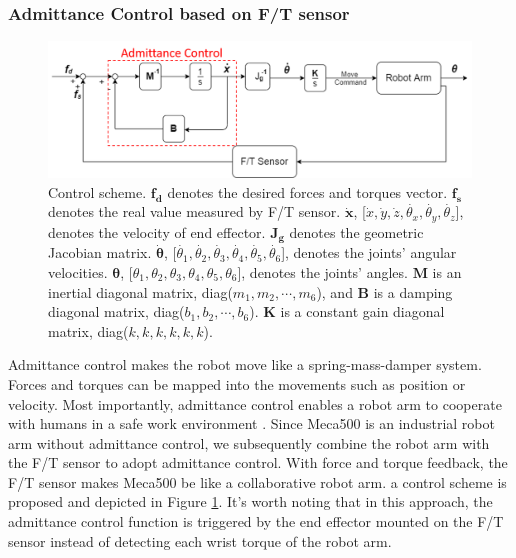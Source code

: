 \subsubsection{Admittance Control based on F/T sensor}
\label{sec:adm ctrl}
\begin{figure}[htbp]
\begin{center}
\includegraphics[width=0.9\linewidth]{Images/adm ctrl.png}
\caption{
Control scheme. $\boldsymbol{f_d}$ denotes the desired forces and torques vector. $\boldsymbol{f_s}$ denotes the real value measured by F/T sensor. $\boldsymbol{\dot{x}}$, [$\dot{x}, \dot{y}, \dot{z}, \dot{\theta _x}, \dot{\theta _y}, \dot{\theta _z}$],  denotes the velocity of end effector. $\mathbf{J_g}$ denotes the geometric Jacobian matrix. $\boldsymbol{\dot{\theta }}$, [$\dot{\theta _1}, \dot{\theta _2}, \dot{\theta _3}, \dot{\theta _4}, \dot{\theta _5}, \dot{\theta _6}$], denotes the joints' angular velocities. $\boldsymbol{\theta }$, [$\theta _1, \theta _2, \theta _3, \theta _4, \theta _5, \theta _6 $], denotes the joints' angles. $\mathbf{M}$ is an inertial diagonal matrix, diag($m_1,m_2,\cdots ,m_6$), and $\mathbf{B}$ is a damping diagonal matrix, diag($b_1,b_2,\cdots ,b_6$). $\mathbf{K}$ is a constant gain diagonal matrix, diag($k,k,k,k,k,k$). 
}\label{fig:adm ctrl}
\end{center}
\end{figure}
\hspace*{6mm}Admittance control makes the robot move like a spring-mass-damper system. Forces and torques can be mapped into the movements such as position or velocity. Most importantly, admittance control enables a robot arm to cooperate with humans in a safe work environment \cite{admctrl}. Since Meca500 is an industrial robot arm without admittance control, we subsequently combine the robot arm with the F/T sensor to adopt admittance control. With force and torque feedback, the F/T sensor makes Meca500 be like a collaborative robot arm. a control scheme is proposed and depicted in Figure \ref{fig:adm ctrl}. It's worth noting that in this approach, the admittance control function is triggered by the end effector mounted on the F/T sensor instead of detecting each wrist torque of the robot arm.
